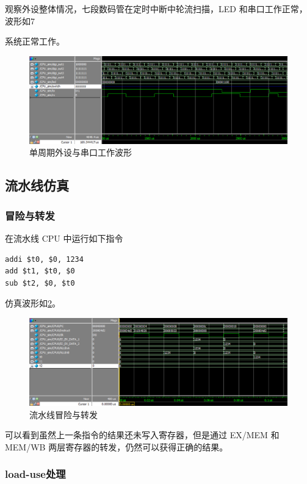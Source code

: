 \documentclass{ctexart}
\begin{document}
	观察外设整体情况，七段数码管在定时中断中轮流扫描，LED 和串口工作正常，波形如7

	系统正常工作。

	\begin{figure}[ht]
		\centering
		\includegraphics[width = \textwidth]{OneCycleTestWave6.eps}
		\caption{单周期外设与串口工作波形}
		\label{simpicture7}
	\end{figure}	

	\subsection{流水线仿真}
	\subsubsection{冒险与转发}
	在流水线 CPU 中运行如下指令

\begin{lstlisting}
addi $t0, $0, 1234
add $t1, $t0, $0
sub $t2, $0, $t0
\end{lstlisting}

	仿真波形如\ref{simpicture8}。

	\begin{figure}[ht]
		\centering
		\includegraphics[width = \textwidth]{PipelineTestWave1.eps}
		\caption{流水线冒险与转发}
		\label{simpicture8}
	\end{figure}		

	可以看到虽然上一条指令的结果还未写入寄存器，但是通过 EX/MEM 和 MEM/WB 两层寄存器的转发，仍然可以获得正确的结果。

	\subsubsection{load-use处理}
	
\end{document}
